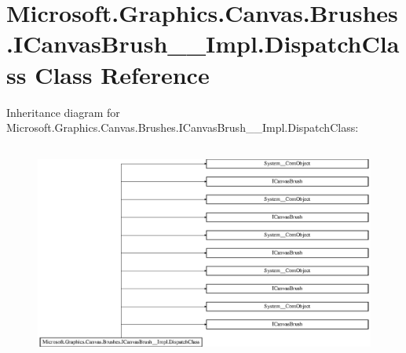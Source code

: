 \hypertarget{class_microsoft_1_1_graphics_1_1_canvas_1_1_brushes_1_1_i_canvas_brush_____impl_1_1_dispatch_class}{}\section{Microsoft.\+Graphics.\+Canvas.\+Brushes.\+I\+Canvas\+Brush\+\_\+\+\_\+\+Impl.\+Dispatch\+Class Class Reference}
\label{class_microsoft_1_1_graphics_1_1_canvas_1_1_brushes_1_1_i_canvas_brush_____impl_1_1_dispatch_class}
Inheritance diagram for Microsoft.\+Graphics.\+Canvas.\+Brushes.\+I\+Canvas\+Brush\+\_\+\+\_\+\+Impl.\+Dispatch\+Class\+:\begin{figure}[H]
\begin{center}
\leavevmode
\includegraphics[height=7.196262cm]{class_microsoft_1_1_graphics_1_1_canvas_1_1_brushes_1_1_i_canvas_brush_____impl_1_1_dispatch_class}
\end{center}
\end{figure}
